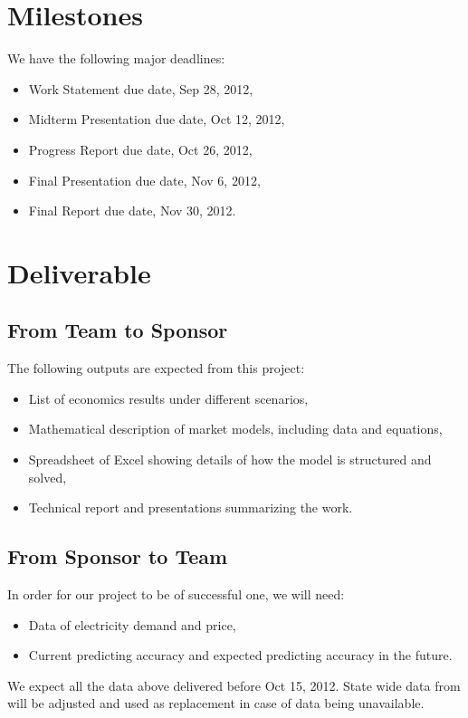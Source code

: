 \documentclass[12pt,letterpaper]{article}
\theoremstyle{definition}
\begin{document}
     
\section{Milestones}
We have the following major deadlines:
\begin{itemize}
    \item Work Statement due date, Sep 28, 2012,
    \item Midterm Presentation due date, Oct 12, 2012,
    \item Progress Report due date, Oct 26, 2012,
    \item Final Presentation due date, Nov 6, 2012,
    \item Final Report due date, Nov 30, 2012.
\end{itemize}

\section{Deliverable}
\subsection{From Team to Sponsor} %
The following outputs are expected from this project:
\begin{itemize}
    \item List of economics results under different scenarios,
    \item Mathematical description of market models, including data and equations,
    \item Spreadsheet of Excel showing details of how the model is structured and solved,
    \item Technical report and presentations summarizing the work.  
\end{itemize}
\subsection{From Sponsor to Team} %

In order for our project to be of successful one, we will need:
\begin{itemize}
    \item Data of electricity demand and price,
    \item Current predicting accuracy and expected predicting accuracy in the future.

\end{itemize}
We expect all the data above delivered before Oct 15, 2012. State wide data from will be adjusted and used as replacement in case of data being unavailable. 



\renewcommand\bibname{Selected Bibliography Including Cited Works}
\nocite{*}

\end{document}

